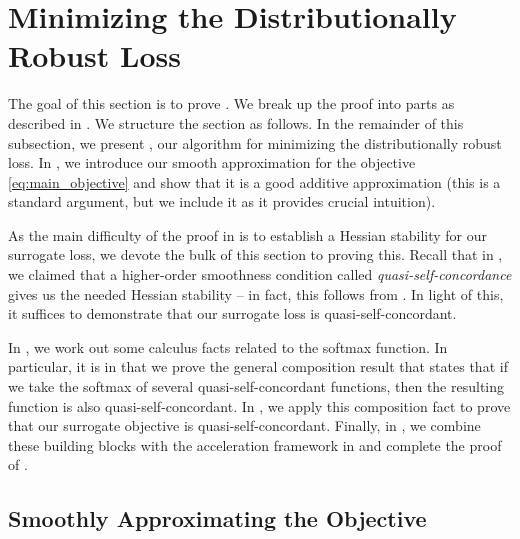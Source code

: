 






\section{Minimizing the Distributionally Robust Loss}\label{sec:gp_robust_proof}

The goal of this section is to prove . We break up the proof into parts as described in . We structure the section as follows. In the remainder of this subsection, we present , our algorithm for minimizing the distributionally robust loss. In , we introduce our smooth approximation for the objective \eqref{eq:main_objective} and show that it is a good additive approximation (this is a standard argument, but we include it as it provides crucial intuition). 

As the main difficulty of the proof in  is to establish a Hessian stability for our surrogate loss, we devote the bulk of this section to proving this. Recall that in , we claimed that a higher-order smoothness condition called \textit{quasi-self-concordance} gives us the needed Hessian stability -- in fact, this follows from \cite[Lemma 11]{msbacon}. In light of this, it suffices to demonstrate that our surrogate loss is quasi-self-concordant. 

In , we work out some calculus facts related to the softmax function. In particular, it is in  that we prove the general composition result  that states that if we take the softmax of several quasi-self-concordant functions, then the resulting function is also quasi-self-concordant. In , we apply this composition fact to prove that our surrogate objective is quasi-self-concordant. Finally, in , we combine these building blocks with the acceleration framework in \cite{msbacon} and complete the proof of .

\subsection{Smoothly Approximating the Objective}
\label{sec:gp_robust_approx}

